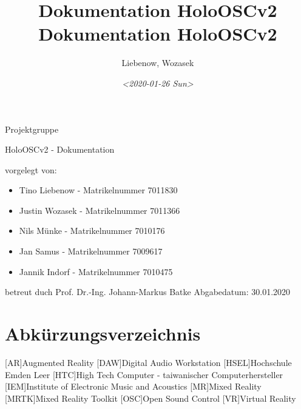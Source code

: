 \documentclass[11pt, titlepage, fleqn]{report}
\author{Liebenow, Wozasek}
\date{\textit{<2020-01-26 Sun>}}
\title{Dokumentation HoloOSCv2\\\medskip
\large Dokumentation HoloOSCv2}
\begin{document}
    \begin{titlepage}%
        \hsellogo\hfill Projektgruppe %
        \par
        \vspace{4cm}
        \noindent\parbox{0.8\textwidth}{\Huge HoloOSCv2 - Dokumentation}  
        \vspace{2cm}

        \Large \noindent vorgelegt von:
        \begin{itemize}
            \item Tino Liebenow - Matrikelnummer 7011830
            \item Justin Wozasek - Matrikelnummer 7011366
            \item Nils Münke - Matrikelnummer 7010176
            \item Jan  Samus - Matrikelnummer 7009617
            \item Jannik Indorf - Matrikelnummer 7010475
        \end{itemize}
        \vspace{2cm}
        betreut duch\newline
        Prof. Dr.-Ing. Johann-Markus Batke\newline
        Abgabedatum: 30.01.2020
    \end{titlepage}
    \newpage
    \tableofcontents %
    \listoffigures%
    \newpage
    \section*{\Huge Abkürzungsverzeichnis}%
    \label{sec:Abkürzungsverzeichnis}
    \vspace{1cm}
    \begin{acronym}
        [AR]{Augmented Reality}
        [DAW]{Digital Audio Workstation}
        [HSEL]{Hochschule Emden Leer}
        [HTC]{High Tech Computer - taiwanischer Computerhersteller}
        [IEM]{Institute of Electronic Music and Acoustics}
        [MR]{Mixed Reality}
        [MRTK]{Mixed Reality Toolkit}
        [OSC]{Open Sound Control}
        [VR]{Virtual Reality}
    \end{acronym}  
    \newpage
\end{document}

